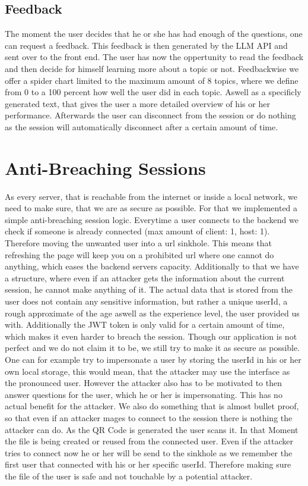 \subsection{Feedback}
The moment the user decides that he or she has had enough of the questions, one can request a feedback.
This feedback is then generated by the LLM API and sent over to the front end.
The user has now the oppertunity to read the feedback and then decide for himself learning more about a topic or not.
Feedbackwise we offer a spider chart limited to the maximum amount of 8 topics, where we define from 0 to a 100 percent how well the user did in each topic.
Aswell as a specificly generated text, that gives the user a more detailed overview of his or her performance.
Afterwards the user can disconnect from the session or do nothing as the session will automatically disconnect after a certain amount of time.

\section{Anti-Breaching Sessions}
As every server, that is reachable from the internet or inside a local network, we need to make sure, that we are as secure as possible.
For that we implemented a simple anti-breaching session logic.
Everytime a user connects to the backend we check if someone is already connected (max amount of client: 1, host: 1).
Therefore moving the unwanted user into a url sinkhole.
This means that refreshing the page will keep you on a prohibited url where one cannot do anything, which eases the backend servers capacity.
Additionally to that we have a structure, where even if an attacker gets the information about the current session, he cannot make anything of it.
The actual data that is stored from the user does not contain any sensitive information, 
but rather a unique userId, a rough approximate of the age aswell as the experience level, the user provided us with.
Additionally the JWT token is only valid for a certain amount of time, which makes it even harder to breach the session.
Though our application is not perfect and we do not claim it to be, we still try to make it as secure as possible.
One can for example try to impersonate a user by storing the userId in his or her own local storage, this would mean, that the attacker may use the interface as
the pronounced user.
However the attacker also has to be motivated to then answer questions for the user, which he or her is impersonating.
This has no actual benefit for the attacker.
We also do something that is almost bullet proof, so that even if an attacker mages to connect to the session there is nothing the attacker can do.
As the QR Code is generated the user scans it.
In that Moment the file is being created or reused from the connected user.
Even if the attacker tries to connect now he or her will be send to the sinkhole as we remember the first user that connected with his or her specific userId.
Therefore making sure the file of the user is safe and not touchable by a potential attacker.

